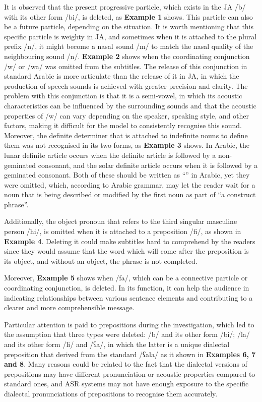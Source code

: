 \documentclass[english]{textolivre}
\newcommand{\ipa}[1]{{\ipafont #1}}
\begin{document}
It is observed that the present progressive particle, which exists in
the JA \ipa{/b/} with its other form \ipa{/bi/}, is deleted, as \textbf{Example 1}
shows. This particle can also be a future particle, depending on the
situation. It is worth mentioning that this specific particle is weighty
in JA, and sometimes when it is attached to the plural prefix \ipa{/n/}, it
might become a nasal sound \ipa{/m/} to match the nasal quality of the
neighbouring sound \ipa{/n/}. \textbf{Example 2} shows when the coordinating
conjunction \ipa{/w/} or \ipa{/wa/} was omitted from the subtitles. The release of
this conjunction in standard Arabic is more articulate than the release
of it in JA, in which the production of speech sounds is achieved with
greater precision and clarity. The problem with this conjunction is that
it is a semi-vowel, in which its acoustic characteristics can be
influenced by the surrounding sounds and that the acoustic properties of
\ipa{/w/} can vary depending on the speaker, speaking style, and other
factors, making it difficult for the model to consistently recognise
this sound. Moreover, the definite determiner that is attached to
indefinite nouns to define them was not recognised in its two forms, as
\textbf{Example 3} shows. In Arabic, the lunar definite article occurs
when the definite article is followed by a non-geminated consonant, and
the solar definite article occurs when it is followed by a geminated
consonant. Both of these should be written as ``'' in Arabic, yet
they were omitted, which, according to Arabic grammar, may let the
reader wait for a noun that is being described or modified by the first
noun as part of ``a construct phrase''.

Additionally, the object pronoun that refers to the third singular
masculine person \ipa{/hi/}, is omitted when it is attached to a preposition
\ipa{/fi/}, as shown in \textbf{Example 4}. Deleting it could make subtitles
hard to comprehend by the readers since they would assume that the word
which will come after the preposition is its object, and without an
object, the phrase is not completed.

Moreover, \textbf{Example 5} shows when \ipa{/fa/}, which can be a connective
particle or coordinating conjunction, is deleted. In its function, it
can help the audience in indicating relationships between various
sentence elements and contributing to a clearer and more comprehensible
message.

Particular attention is paid to prepositions during the investigation,
which led to the assumption that three types were deleted: \ipa{/b/} and its
other form \ipa{/bi/}; \ipa{/la/} and its other form \ipa{/li/} and \ipa{/ʕa/}, in which the
latter is a unique dialectal preposition that derived from the standard
\ipa{/ʕala/} as it shown in \textbf{Examples 6, 7 and 8}. Many reasons could
be related to the fact that the dialectal versions of prepositions may
have different pronunciation or acoustic properties compared to standard
ones, and ASR systems may not have enough exposure to the specific
dialectal pronunciations of prepositions to recognise them accurately.
\end{document}
